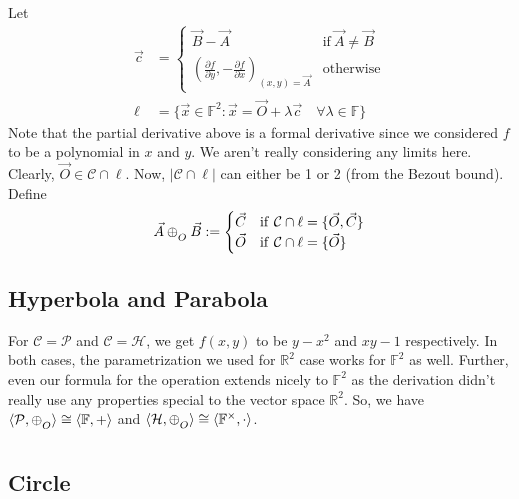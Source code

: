 \noindent
Let 
\begin{align*}
    \vec{c} &=
        \begin{cases}
            \vec{B}-\vec{A} & \mathrm{if}\ \vec{A}\neq\vec{B} \\
            \left(
                \frac{\partial f}{\partial y}, -\frac{\partial f}{\partial x}
            \right)_{(x,y)=\vec{A}} & \mathrm{otherwise}
        \end{cases} \\
    \ell &=
        \{\vec{x}\in\mathbb{F}^2:
        \vec{x} = \vec{O} + \lambda\vec{c}\quad\forall\lambda\in\mathbb{F}\}
\end{align*}
Note that the partial derivative above is a formal derivative since we considered
$f$ to be a polynomial in $x$ and $y$. We aren't really considering any limits
here. Clearly, $\vec{O}\in\mathcal{C}\cap\ell$. Now, $|\mathcal{C}\cap\ell|$ can
either be 1 or 2 (from the Bezout bound). Define
\[
    \vec{A} \conop \vec{B} :=
        \begin{cases}
            \vec{C} & \mathrm{if}\ \mathcal{C}\cap\ell = \{\vec{O},\vec{C}\} \\
            \vec{O} & \mathrm{if}\ \mathcal{C}\cap\ell = \{\vec{O}\} \\
        \end{cases}
\]

\subsection*{Hyperbola and Parabola}

For $\mathcal{C}=\mathcal{P}$ and $\mathcal{C}=\mathcal{H}$, we get $f(x,y)$ to be
$y - x^2$ and $xy - 1$ respectively. In both cases, the parametrization we used
for $\mathbb{R}^2$ case works for $\mathbb{F}^2$ as well. Further, even our
formula for the operation extends nicely to $\mathbb{F}^2$ as the derivation
didn't really use any properties special to the vector space $\mathbb{R}^2$. So,
we have $\langle\mathcal{P},\conop\rangle \cong \langle\mathbb{F},+\rangle$ and
$\langle\mathcal{H},\conop\rangle \cong \langle\mathbb{F}^\times,\cdot\rangle$.

\subsection*{Circle}

